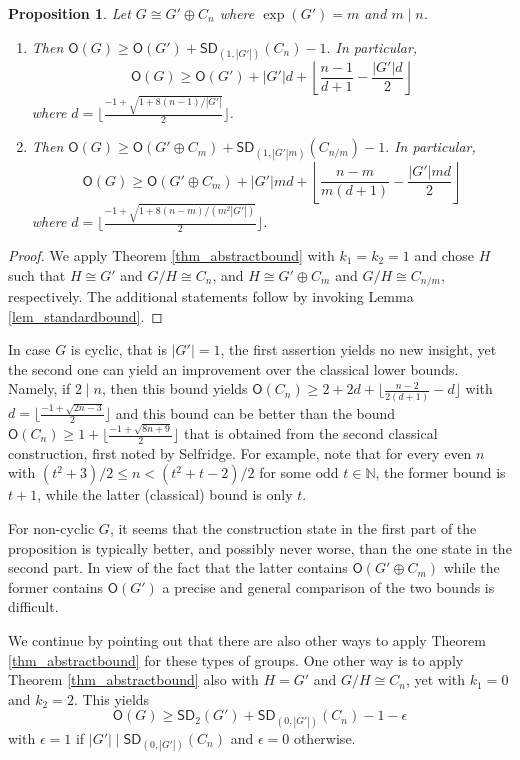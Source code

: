 \documentclass{amsart}
\newtheorem{pro}[thm]{Proposition}
\theoremstyle{definition}
\numberwithin{equation}{section}
\begin{document}
\begin{pro}
Let $G \cong G'\oplus C_n$ where $\exp(G')=m$ and $m \mid n$.
\begin{enumerate}
\item Then
\({\mathsf{O}}(G)\ge {\mathsf{O}}(G')+ {\mathsf{SD}}_{(1,|G'|)}(C_n)-1.
\)
In particular,
\[{\mathsf{O}}(G)\ge {\mathsf{O}}(G')+|G'|d+  \left\lfloor \frac{n-1}{d+1} -\frac{|G'|d}{2}\right\rfloor\]
where $d= \bigl\lfloor\frac{-1+\sqrt{1+8(n-1)/|G'|}}{2} \bigr\rfloor$.
\item Then
\({\mathsf{O}}(G)\ge {\mathsf{O}}(G'\oplus C_m)+ {\mathsf{SD}}_{(1,|G'|m)}(C_{n/m})-1.
\)
In particular,
\[{\mathsf{O}}(G)\ge {\mathsf{O}}(G' \oplus C_m) + |G'| m d + \left\lfloor \frac{n - m}{m(d+1)} -\frac{|G'|md}{2}\right\rfloor\]
where $d=\bigl \lfloor\frac{-1+\sqrt{1+8(n-m)/(m^2|G'|)}}{2}\bigr \rfloor$.
\end{enumerate}
\end{pro}
\begin{proof}
We apply Theorem \ref{thm_abstractbound} with $k_1=k_2=1$ and chose $H$ such that $H \cong G'$ and $G/H \cong C_n$,
and $H \cong G' \oplus C_m$ and $G/H \cong C_{n/m}$, respectively.
The additional statements follow by invoking Lemma
\ref{lem_standardbound}.
\end{proof}

In case $G$ is cyclic, that is $|G'|=1$, the first assertion yields no new insight,
yet the second one can yield an improvement over the classical lower bounds.
Namely, if $2 \mid n$, then this bound yields ${\mathsf{O}}(C_n) \ge 2 + 2 d + \lfloor \frac{n-2}{2(d+1)} -d \rfloor $ with $d = \lfloor \frac{-1 + \sqrt{2n-3}}{2} \rfloor$
and this bound can be better
than the bound ${\mathsf{O}}(C_n)\ge 1 + \lfloor\frac{-1 +  \sqrt{8n+9}}{2} \rfloor$
that is obtained from the second classical construction, first noted by Selfridge.
For example, note that
for every even $n$ with $(t^2+3)/2\le n < (t^2 + t -2)/2$ for some odd $t\in \mathbb{N}$, the former bound
is $t+1$, while the latter (classical) bound is only $t$.

For non-cyclic $G$, it seems that the construction state in the first part of the proposition is typically
better, and possibly never worse, than the one state in the second part.
In view of the fact that the latter contains ${\mathsf{O}}(G'\oplus C_m)$ while the former contains ${\mathsf{O}}(G')$
a precise and general comparison of the two bounds is difficult.

We continue by pointing out that there are also other ways to apply Theorem \ref{thm_abstractbound} for these types of groups.
One other way is to apply Theorem \ref{thm_abstractbound} also
with $H=G'$ and $G/H \cong C_n$, yet with $k_1=0$ and $k_2=2$. This yields
\[{\mathsf{O}}(G)\ge {\mathsf{SD}}_2(G')+ {\mathsf{SD}}_{(0,|G'|)}(C_n)-1-\epsilon
\]
with $\epsilon = 1$ if $|G'| \mid {\mathsf{SD}}_{(0,|G'|)}(C_n)$ and $\epsilon = 0$ otherwise.
\end{document}
